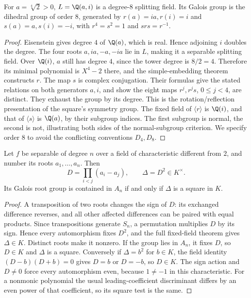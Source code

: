 \begin{example}
For $a=\sqrt[4]{2}>0$, $L=\Q(a,i)$ is a degree-$8$ splitting field. Its Galois group is the dihedral group of order $8$, generated by $r(a)=ia,r(i)=i$ and $s(a)=a,s(i)=-i$, with $r^4=s^2=1$ and $srs=r^{-1}$.
\end{example}
\begin{proof}
Eisenstein gives degree $4$ of $\Q(a)$, which is real. Hence adjoining $i$ doubles the degree. The four roots $a,ia,-a,-ia$ lie in $L$, making it a separable splitting field. Over $\Q(i)$, $a$ still has degree $4$, since the tower degree is $8/2=4$. Therefore its minimal polynomial is $X^4-2$ there, and the simple-embedding theorem constructs $r$. The map $s$ is complex conjugation. Their formulas give the stated relations on both generators $a,i$, and show the eight maps $r^j,r^js$, $0\leq j<4$, are distinct. They exhaust the group by its degree. This is the rotation/reflection presentation of the square's symmetry group. The fixed field of $\langle r\rangle$ is $\Q(i)$, and that of $\langle s\rangle$ is $\Q(a)$, by their subgroup indices. The first subgroup is normal, the second is not, illustrating both sides of the normal-subgroup criterion. We specify order $8$ to avoid the conflicting conventions $D_4,D_8$.
\end{proof}

\begin{theorem}
Let $f$ be separable of degree $n$ over a field of characteristic different from $2$, and number its roots $a_1,\ldots,a_n$. Then
\[D=\prod_{i<j}(a_i-a_j),\qquad\Delta=D^2\in K^\times.
\]
Its Galois root group is contained in $A_n$ if and only if $\Delta$ is a square in $K$.
\end{theorem}
\begin{proof}
A transposition of two roots changes the sign of $D$: its exchanged difference reverses, and all other affected differences can be paired with equal products. Since transpositions generate $S_n$, a permutation multiplies $D$ by its sign. Hence every automorphism fixes $D^2$, and the full fixed-field theorem gives $\Delta\in K$. Distinct roots make it nonzero. If the group lies in $A_n$, it fixes $D$, so $D\in K$ and $\Delta$ is a square. Conversely if $\Delta=b^2$ for $b\in K$, the field identity $(D-b)(D+b)=0$ gives $D=b$ or $D=-b$, so $D\in K$. The sign action and $D\ne0$ force every automorphism even, because $1\ne-1$ in this characteristic. For a nonmonic polynomial the usual leading-coefficient discriminant differs by an even power of that coefficient, so its square test is the same.
\end{proof}

